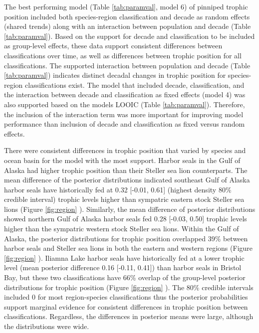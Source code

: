 \documentclass [11pt, proquest] {uwthesis}[2015/03/03]
\begin{document}
The best performing model (Table \ref{tab:paramval}, model 6) of
pinniped trophic position included both species-region classification
and decade as random effects (shared trends) along with an interaction
between population and decade (Table \ref{tab:paramval}). Based on the
support for decade and classification to be included as group-level
effects, these data support consistent differences between
classifications over time, as well as differences between trophic
position for all classifications. The supported interaction between
population and decade (Table \ref{tab:paramval}) indicates distinct
decadal changes in trophic position for species-region classifications
exist. The model that included decade, classification, and the
interaction between decade and classification as fixed effects (model 4)
was also supported based on the models LOOIC (Table \ref{tab:paramval}).
Therefore, the inclusion of the interaction term was more important for
improving model performance than inclusion of decade and classification
as fixed versus random effects.

There were consistent differences in trophic position that varied by
species and ocean basin for the model with the most support. Harbor
seals in the Gulf of Alaska had higher trophic position than their
Steller sea lion counterparts. The mean difference of the posterior
distributions indicated southeast Gulf of Alaska harbor seals have
historically fed at 0.32 {[}-0.01, 0.61{]} (highest density 80\%
credible interval) trophic levels higher than sympatric eastern stock
Steller sea lions (Figure \ref{fig:region} ). Similarly, the mean
difference of posterior distributions showed northern Gulf of Alaska
harbor seals fed 0.28 {[}-0.03, 0.50{]} trophic levels higher than the
sympatric western stock Steller sea lions. Within the Gulf of Alaska,
the posterior distributions for trophic position overlapped 39\% between
harbor seals and Steller sea lions in both the eastern and western
regions (Figure \ref{fig:region} ). Iliamna Lake harbor seals have
historically fed at a lower trophic level (mean posterior difference
0.16 {[}-0.11, 0.41{]}) than harbor seals in Bristol Bay, but these two
classifications have 66\% overlap of the group-level posterior
distributions for trophic position (Figure \ref{fig:region} ). The 80\%
credible intervals included 0 for most region-species classifications
thus the posterior probabilities support marginal evidence for
consistent differences in trophic position between classifications.
Regardless, the differences in posterior means were large, although the
distributions were wide.
\end{document}
